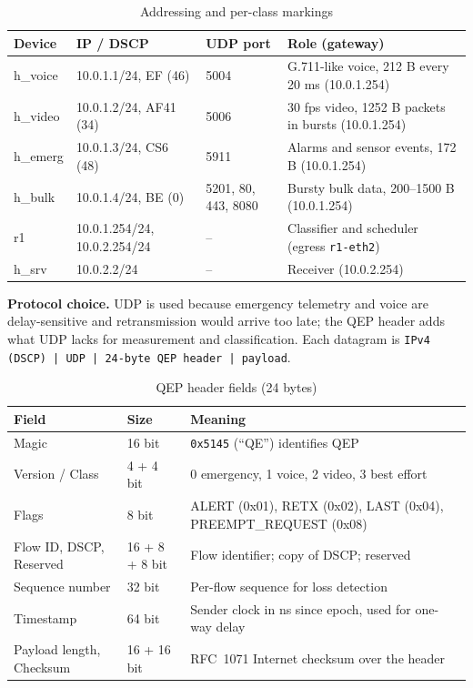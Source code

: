 \documentclass[12pt,a4paper]{article}
\newcommand{\code}[1]{\texttt{#1}}
\begin{document}
\begin{table}[H]\centering\small
\caption{Addressing and per-class markings}\label{tab:addr}
\begin{tabularx}{\textwidth}{|l|l|l|X|}\hline
\textbf{Device} & \textbf{IP / DSCP} & \textbf{UDP port} & \textbf{Role (gateway)}\\\hline
h\_voice & 10.0.1.1/24, EF (46) & 5004 & G.711-like voice, 212 B every 20 ms (10.0.1.254)\\\hline
h\_video & 10.0.1.2/24, AF41 (34) & 5006 & 30 fps video, 1252 B packets in bursts (10.0.1.254)\\\hline
h\_emerg & 10.0.1.3/24, CS6 (48) & 5911 & Alarms and sensor events, 172 B (10.0.1.254)\\\hline
h\_bulk & 10.0.1.4/24, BE (0) & 5201, 80, 443, 8080 & Bursty bulk data, 200--1500 B (10.0.1.254)\\\hline
r1 & 10.0.1.254/24, 10.0.2.254/24 & -- & Classifier and scheduler (egress \code{r1-eth2})\\\hline
h\_srv & 10.0.2.2/24 & -- & Receiver (10.0.2.254)\\\hline
\end{tabularx}
\end{table}

\textbf{Protocol choice.} UDP is used because emergency telemetry and voice are delay-sensitive and
retransmission would arrive too late; the QEP header adds what UDP lacks for measurement and
classification. Each datagram is \code{IPv4 (DSCP) | UDP | 24-byte QEP header | payload}.

\begin{table}[H]\centering\small
\caption{QEP header fields (24 bytes)}\label{tab:qep}
\begin{tabularx}{\textwidth}{|l|l|X|}\hline
\textbf{Field} & \textbf{Size} & \textbf{Meaning}\\\hline
Magic & 16 bit & \code{0x5145} (``QE'') identifies QEP\\\hline
Version / Class & 4 + 4 bit & 0 emergency, 1 voice, 2 video, 3 best effort\\\hline
Flags & 8 bit & ALERT (0x01), RETX (0x02), LAST (0x04), PREEMPT\_REQUEST (0x08)\\\hline
Flow ID, DSCP, Reserved & 16 + 8 + 8 bit & Flow identifier; copy of DSCP; reserved\\\hline
Sequence number & 32 bit & Per-flow sequence for loss detection\\\hline
Timestamp & 64 bit & Sender clock in ns since epoch, used for one-way delay\\\hline
Payload length, Checksum & 16 + 16 bit & RFC~1071 \cite{rfc1071} Internet checksum over the header\\\hline
\end{tabularx}
\end{table}
\end{document}
